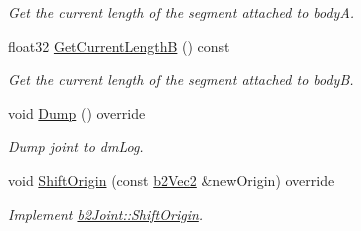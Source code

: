 \begin{DoxyCompactItemize}
\begin{DoxyCompactList}\small\item\em Get the current length of the segment attached to bodyA. \end{DoxyCompactList}\item 
\mbox{\label{classb2PulleyJoint_aa2d15dc26b2df0a446ccda652058085d}} 
float32 \mbox{\hyperlink{classb2PulleyJoint_aa2d15dc26b2df0a446ccda652058085d}{Get\+Current\+LengthB}} () const
\begin{DoxyCompactList}\small\item\em Get the current length of the segment attached to bodyB. \end{DoxyCompactList}\item 
\mbox{\label{classb2PulleyJoint_a51b3fa745fc43f806cee1328099b4623}} 
void \mbox{\hyperlink{classb2PulleyJoint_a51b3fa745fc43f806cee1328099b4623}{Dump}} () override
\begin{DoxyCompactList}\small\item\em Dump joint to dm\+Log. \end{DoxyCompactList}\item 
\mbox{\label{classb2PulleyJoint_a5a9e626c758380fe565837bedb3dc018}} 
void \mbox{\hyperlink{classb2PulleyJoint_a5a9e626c758380fe565837bedb3dc018}{Shift\+Origin}} (const \mbox{\hyperlink{structb2Vec2}{b2\+Vec2}} \&new\+Origin) override
\begin{DoxyCompactList}\small\item\em Implement \mbox{\hyperlink{classb2Joint_a7804f649e993dc0fd9ae47fde5601f90}{b2\+Joint\+::\+Shift\+Origin}}. \end{DoxyCompactList}\end{DoxyCompactItemize}
